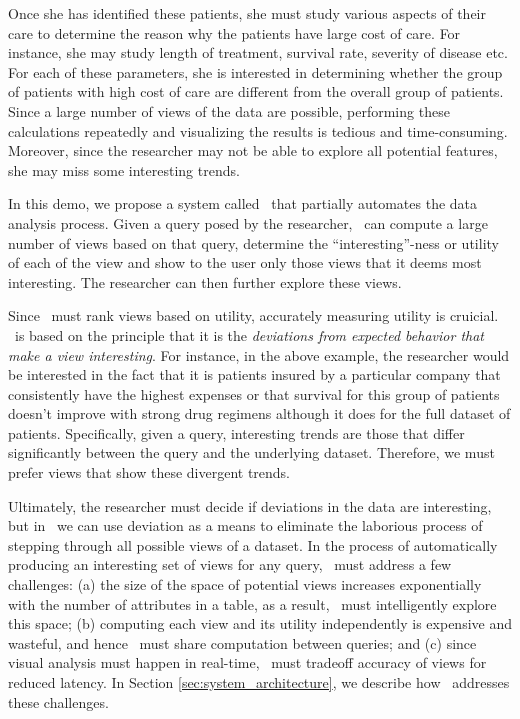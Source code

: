 Once she has identified these patients, she must study various aspects of their
care to determine the reason why the patients have large cost of care. For
instance, she may study length of treatment, survival rate, severity of disease
etc. For each of these parameters, she is interested in determining whether the
group of patients with high cost of care are different from the overall group of
patients. Since a large number of views of the data are possible, performing
these calculations repeatedly and visualizing the results is tedious and
time-consuming. Moreover, since the researcher may not be able to explore all
potential features, she may miss some interesting trends.

In this demo, we propose a system called \SeeDB\ that partially automates the
data analysis process. Given a query posed by the researcher, \SeeDB\ can
compute a large number of views based on that query, determine the
``interesting''-ness or utility of each of the view and show to the user only
those views that it deems most interesting. The researcher can then further
explore these views. 

Since \SeeDB\ must rank views based on utility, accurately measuring utility is
cruicial. \SeeDB\ is based on the principle that it is the {\it deviations from
expected behavior that make a view interesting}. For instance, in the above
example, the researcher would be interested in the fact that it is patients
insured by a particular company that consistently have the highest expenses or
that survival for this group of patients doesn't improve with strong drug
regimens although it does for the full dataset of patients. Specifically, given
a query, interesting trends are those that differ significantly between the
query and the underlying dataset. Therefore, we must prefer views that show
these divergent trends.

Ultimately, the researcher must decide if deviations in the data are
interesting, but in \SeeDB\ we can use deviation as a means to eliminate the
laborious process of stepping through all possible views of a dataset.
In the process of automatically producing an interesting set of views for any
query, \SeeDB\ must address a few challenges: (a) the size of
the space of potential views increases exponentially with the number of
attributes in a table, as a result, \SeeDB\ must intelligently explore this
space; (b) computing each view and its utility independently is expensive and
wasteful, and hence \SeeDB\ must share computation between queries; and (c)
since visual analysis must happen in real-time, \SeeDB\ must tradeoff accuracy
of views for reduced latency. In Section \ref{sec:system_architecture}, we
describe how \SeeDB\ addresses these challenges.

